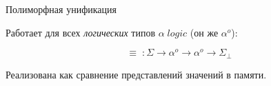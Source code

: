 \documentclass[10pt, mathserif]{beamer}
\newcommand{\oo}[1]{{#1}^o}
\theoremstyle{definition}
\begin{document}
\begin{frame}[fragile]{Полиморфная унификация}

Работает для всех \emph{логических} типов $\alpha\; logic$ (он же $\oo{\alpha}$):

$$
\equiv\;\colon \Sigma\to\oo{\alpha}\to\oo{\alpha}\to\Sigma_{\perp}
$$
\pause

Реализована как сравнение представлений значений в памяти.

%

%
\end{frame}
\end{document}
